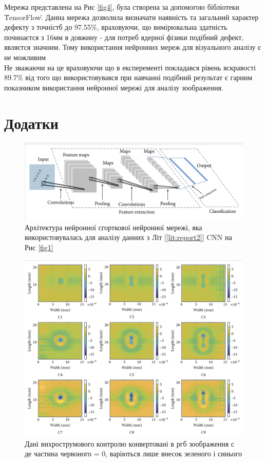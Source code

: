 \documentclass[a4paper, 14pt]{article}
\numberwithin{equation}{section}
\numberwithin{table}{section}
\begin{document}
Мережа представлена на Рис \ref{fig4}, була створена за допомогою бібліотеки \"TensorFlow\". 
Данна мережа дозволила визначати наявність та загальний характер дефекту з точністб до 97.55\%, враховуючи, що вимірювальна здатність починаєтся з 16мм в довжину - для потреб ядерної фізики подібний дефект, являєтся значним. Тому використання нейронних мереж для візуального аналізу є не можливим\\
Не зважаючи на це враховуючи що в експеременті покладався рівень яскравості 89.7\% від того що використовувався при навчанні подібний результат є гарним показником використання нейронної мережі для аналізу зоображення. 

\newpage
\section{Додатки}
\begin{figure}[htbp]
	\centerline{\includegraphics[scale=.7]{res/image2.png}}
	\caption{Архітектура нейронної сгорткової нейронної мережі, яка використовувалась для аналізу данних з Літ [\ref{lit:report2}] CNN на Рис \ref{fig1}}
	\label{fig2}
\end{figure}
\begin{figure}[!h]
	\centerline{\includegraphics[scale=.7]{res/image3.png}}
	\caption{Дані вихрострумового контролю конвертовані в ргб зоображення с де частина червоного = 0, варіються лише внесок зеленого і синього}
	\label{fig3}
\end{figure}
\end{document}
